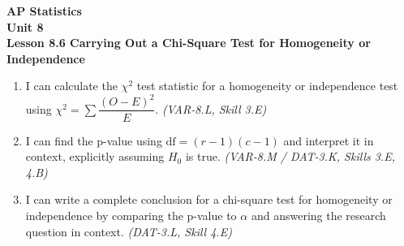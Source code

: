 \documentclass[10pt]{article}
\begin{document}
\vspace{-0.8in}

\begin{center}
  {\color{white}\textbf{\LARGE AP Statistics}}\\[4pt]
  {\color{skymid}\large\textbf{Unit 8}}\\[6pt]
  {\color{white}\textbf{\large Lesson 8.6 \quad Carrying Out a Chi-Square Test for Homogeneity or Independence}}
\end{center}

\vspace{0.22in}
\namedateperiod
\vspace{0.18in}

\begin{learningtargetbox}
\small
\begin{enumerate}[leftmargin=1.5em, itemsep=5pt]
  \item I can calculate the $\chi^2$ test statistic for a homogeneity or independence
        test using $\chi^2 = \displaystyle\sum \dfrac{(O-E)^2}{E}$.
        \textit{(VAR-8.L, Skill 3.E)}
  \item I can find the p-value using $\text{df} = (r-1)(c-1)$ and interpret it in
        context, explicitly assuming $H_0$ is true.
        \textit{(VAR-8.M / DAT-3.K, Skills 3.E, 4.B)}
  \item I can write a complete conclusion for a chi-square test for homogeneity or
        independence by comparing the p-value to $\alpha$ and answering the research
        question in context.
        \textit{(DAT-3.L, Skill 4.E)}
\end{enumerate}
\end{learningtargetbox}

\vspace{0.14in}
\end{document}
